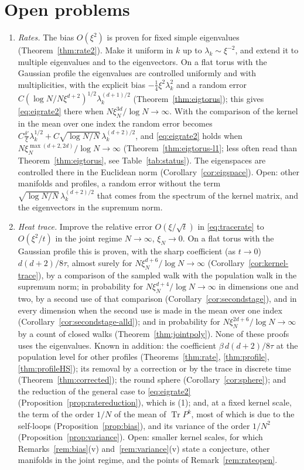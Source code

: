 \documentclass[11pt,a4paper]{article}
\theoremstyle{stmt}
\theoremstyle{defn}
\theoremstyle{rmk}
\numberwithin{equation}{section}
\DeclareMathOperator{\Tr}{Tr}
\begin{document}
\section{Open problems}\label{sec:open}

\begin{enumerate}
\item \emph{Rates.} The bias $O(\xi^2)$ is proven for fixed simple eigenvalues (Theorem~\ref{thm:rate2}). Make it uniform in $k$ up to $\lambda_k\sim\xi^{-2}$, and extend it to multiple eigenvalues and to the eigenvectors. On a flat torus with the Gaussian profile the eigenvalues are controlled uniformly and with multiplicities, with the explicit bias $-\frac14\xi^2\lambda_k^2$ and a random error $C(\log N/N\xi^{d+2})^{1/2}\lambda_k^{(d+1)/2}$ (Theorem~\ref{thm:eigtorus}); this gives \eqref{eq:eigrate2} there when $N\xi_N^{3d}/\log N\to\infty$. With the comparison of the kernel in the mean over one index the random error becomes $C\frac{\delta'}\xi\lambda_k^{1/2}+C\sqrt{\log N/N}\,\lambda_k^{(d+2)/2}$, and \eqref{eq:eigrate2} holds when $N\xi_N^{\max(d+2,2d)}/\log N\to\infty$ (Theorem~\ref{thm:eigtorus-l1}; less often read than Theorem~\ref{thm:eigtorus}, see Table~\ref{tab:status}). The eigenspaces are controlled there in the Euclidean norm (Corollary~\ref{cor:eigspace}). Open: other manifolds and profiles, a random error without the term $\sqrt{\log N/N}\,\lambda_k^{(d+2)/2}$ that comes from the spectrum of the kernel matrix, and the eigenvectors in the supremum norm.
\item \emph{Heat trace.} Improve the relative error $O(\xi/\sqrt t)$ in \eqref{eq:tracerate} to $O(\xi^2/t)$ in the joint regime $N\to\infty$, $\xi_N\to0$. On a flat torus with the Gaussian profile this is proven, with the sharp coefficient (as $t\to0$) $d(d+2)/8\tau$, almost surely for $N\xi_N^{d+6}/\log N\to\infty$ (Corollary~\ref{cor:kernel-trace}), by a comparison of the sampled walk with the population walk in the supremum norm; in probability for $N\xi_N^{d+4}/\log N\to\infty$ in dimensions one and two, by a second use of that comparison (Corollary~\ref{cor:secondstage}), and in every dimension when the second use is made in the mean over one index (Corollary~\ref{cor:secondstage-alld}); and in probability for $N\xi_N^{2d+6}/\log N\to\infty$ by a count of closed walks (Theorem~\ref{thm:jointpoly}). None of these proofs uses the eigenvalues. Known in addition: the coefficient $\beta\,d(d+2)/8\tau$ at the population level for other profiles (Theorems~\ref{thm:rate}, \ref{thm:profile}, \ref{thm:profileHS}); its removal by a correction or by the trace in discrete time (Theorem~\ref{thm:corrected}); the round sphere (Corollary~\ref{cor:sphere}); and the reduction of the general case to \eqref{eq:eigrate2} (Proposition~\ref{prop:ratereduction}), which is (1); and, at a fixed kernel scale, the term of the order $1/N$ of the mean of $\Tr P^k$, most of which is due to the self-loops (Proposition~\ref{prop:bias}), and its variance of the order $1/N^2$ (Proposition~\ref{prop:variance}). Open: smaller kernel scales, for which Remarks~\ref{rem:bias}(v) and~\ref{rem:variance}(v) state a conjecture, other manifolds in the joint regime, and the points of Remark~\ref{rem:rateopen}.

\end{enumerate}
\end{document}
